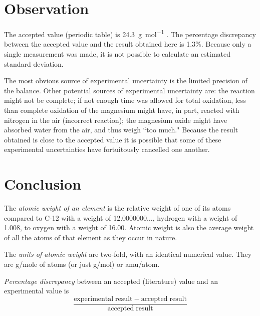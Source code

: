 \documentclass{article}
\begin{document}
\section{Observation}

The accepted value (periodic table) is \SI{24.3}{\gram\per\mole} \cite{Smith:2012qr}. The percentage discrepancy between the accepted value and the result obtained here is 1.3\%. Because only a single measurement was made, it is not possible to calculate an estimated standard deviation.

The most obvious source of experimental uncertainty is the limited precision of the balance. Other potential sources of experimental uncertainty are: the reaction might not be complete; if not enough time was allowed for total oxidation, less than complete oxidation of the magnesium might have, in part, reacted with nitrogen in the air (incorrect reaction); the magnesium oxide might have absorbed water from the air, and thus weigh ``too much." Because the result obtained is close to the accepted value it is possible that some of these experimental uncertainties have fortuitously cancelled one another.


\section{Conclusion}

\begin{enumerate}
\begin{item}
The \emph{atomic weight of an element} is the relative weight of one of its atoms compared to C-12 with a weight of 12.0000000$\ldots$, hydrogen with a weight of 1.008, to oxygen with a weight of 16.00. Atomic weight is also the average weight of all the atoms of that element as they occur in nature.
\end{item}
\begin{item}
The \emph{units of atomic weight} are two-fold, with an identical numerical value. They are g/mole of atoms (or just g/mol) or amu/atom.
\end{item}
\begin{item}
\emph{Percentage discrepancy} between an accepted (literature) value and an experimental value is
\begin{equation*}
\frac{\mathrm{experimental\;result} - \mathrm{accepted\;result}}{\mathrm{accepted\;result}}
\end{equation*}
\end{item}
\end{enumerate}






\end{document}
